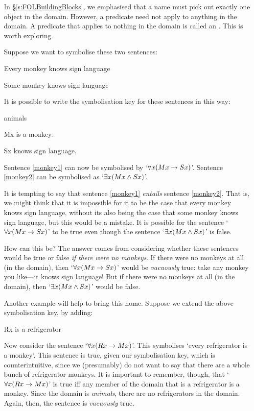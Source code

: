In \S\ref{s:FOLBuildingBlocks}, we emphasised that a name must pick out exactly one object in the domain. However, a predicate need not apply to anything in the domain. A predicate that applies to nothing in the domain is called an . This is worth exploring.


Suppose we want to symbolise these two sentences:
	\begin{earg}
		\item[\ex{monkey1}] Every monkey knows sign language
		\item[\ex{monkey2}] Some monkey knows sign language
	\end{earg}
It is possible to write the symbolisation key for these sentences in this way:
	\begin{ekey}
		\item[\text{domain}] animals
		\item[Mx]  is a monkey.
		\item[Sx]  knows sign language.
	\end{ekey}
Sentence \ref{monkey1} can now be symbolised by `$\forall x(Mx \rightarrow Sx)$'. Sentence \ref{monkey2} can be symbolised as `$\exists x(Mx \wedge Sx)$'.

It is tempting to say that sentence \ref{monkey1} \emph{entails} sentence \ref{monkey2}. That is, we might think that it is impossible for it to be the case that every monkey knows sign language, without its also being the case that some monkey knows sign language, but this would be a mistake. It is possible for the sentence `$\forall x(Mx \rightarrow Sx)$' to be true even though the sentence `$\exists x(Mx \wedge Sx)$' is false.

How can this be? The answer comes from considering whether these sentences would be true or false \emph{if there were no monkeys}. If there were no monkeys at all (in the domain), then `$\forall x(Mx \rightarrow Sx)$' would be \emph{vacuously} true: take any monkey you like---it knows sign language! But if there were no monkeys at all (in the domain), then `$\exists x(Mx \wedge Sx)$' would be false.

Another example will help to bring this home. Suppose we extend the above symbolisation key, by adding:
	\begin{ekey}
		\item[Rx]  is a refrigerator
	\end{ekey}
Now consider the sentence `$\forall x(Rx \rightarrow Mx)$'. This symbolises `every refrigerator is a monkey'. This sentence is true, given our symbolisation key, which is counterintuitive, since we (presumably) do not want to say that there are a whole bunch of refrigerator monkeys. It is important to remember, though, that `$\forall x(Rx \rightarrow Mx)$' is true iff any member of the domain that is a refrigerator is a monkey. Since the domain is \emph{animals}, there are no refrigerators in the domain. Again, then, the sentence is \emph{vacuously} true. 

